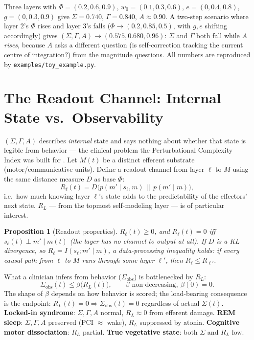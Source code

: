\documentclass[11pt]{article}
\newtheorem{proposition}{Proposition}
\begin{document}
Three layers with $\Phi=(0.2,0.6,0.9)$, $w_0=(0.1,0.3,0.6)$, $e=(0,0.4,0.8)$, $g=(0,0.3,0.9)$ give $\Sigma=0.740$, $\Gamma=0.840$, $A\approx0.90$. A two-step scenario where layer 2's $\Phi$ rises and layer 3's falls ($\Phi\to(0.2,0.85,0.5)$, with $g,e$ shifting accordingly) gives $(\Sigma,\Gamma,A)\to(0.575,0.680,0.96)$: $\Sigma$ and $\Gamma$ both fall while $A$ \emph{rises}, because $A$ asks a different question (is self-correction tracking the current centre of integration?) from the magnitude questions. All numbers are reproduced by \texttt{examples/toy\_example.py}.

\section{The Readout Channel: Internal State vs.\ Observability}\label{sec:readout}

$(\Sigma,\Gamma,A)$ describes \emph{internal} state and says nothing about whether that state is legible from behavior --- the clinical problem the Perturbational Complexity Index was built for \cite{casali2013}. Let $M(t)$ be a distinct efferent substrate (motor/communicative units). Define a readout channel from layer $\ell$ to $M$ using the same distance measure $D$ as base $\Phi$:
\[
R_\ell(t) = D\big(p(m'\mid s_\ell,m)\,\|\,p(m'\mid m)\big),
\]
i.e.\ how much knowing layer $\ell$'s state adds to the predictability of the effectors' next state. $R_L$ --- from the topmost self-modeling layer --- is of particular interest.

\begin{proposition}[Readout properties]
$R_\ell(t)\ge0$, and $R_\ell(t)=0$ iff $s_\ell(t)\perp m'\mid m(t)$ (the layer has no channel to output at all). If $D$ is a KL divergence, so $R_\ell=I(s_\ell;m'\mid m)$, a data-processing inequality holds: if every causal path from $\ell$ to $M$ runs through some layer $\ell'$, then $R_\ell\le R_{\ell'}$.
\end{proposition}

What a clinician infers from behavior ($\Sigma_{\text{obs}}$) is bottlenecked by $R_L$:
\[
\Sigma_{\text{obs}}(t) \le \beta\big(R_L(t)\big), \qquad \beta \text{ non-decreasing},\ \beta(0)=0.
\]
The shape of $\beta$ depends on how behavior is scored; the load-bearing consequence is the endpoint: $R_L(t)=0 \Rightarrow \Sigma_{\text{obs}}(t)=0$ regardless of actual $\Sigma(t)$. \textbf{Locked-in syndrome}: $\Sigma,\Gamma,A$ normal, $R_L\approx0$ from efferent damage. \textbf{REM sleep}: $\Sigma,\Gamma,A$ preserved (PCI $\approx$ wake), $R_L$ suppressed by atonia. \textbf{Cognitive motor dissociation}: $R_L$ partial. \textbf{True vegetative state}: both $\Sigma$ and $R_L$ low.
\end{document}
